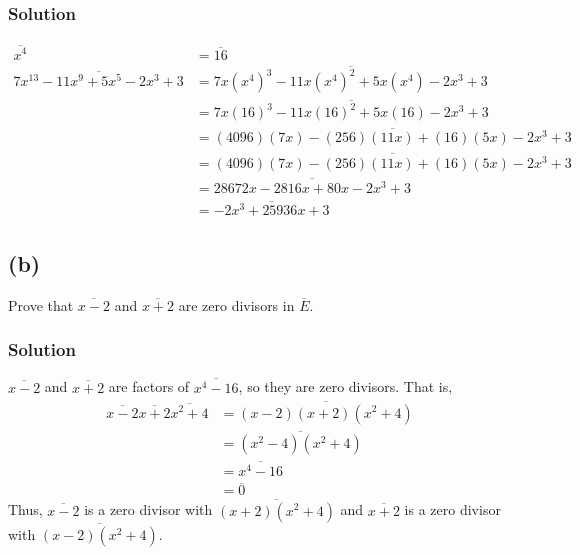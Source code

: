 \documentclass[fleqn]{article}
\begin{document}
            \subsubsection{Solution}
            \begin{align}
                \overline{x^4} &= \overline{16} \\
                \overline{7x^{13} - 11x^9 + 5x^5 - 2x^3 + 3}
                    &= \overline{7x (x^4)^3 - 11x (x^4)^2 + 5x (x^4) - 2x^3 + 3} \\
                    &= \overline{7x (16)^3 - 11x (16)^2 + 5x (16) - 2x^3 + 3} \\
                    &= \overline{(4096)(7x) - (256)(11x) + (16)(5x) - 2x^3 + 3} \\
                    &= \overline{(4096)(7x) - (256)(11x) + (16)(5x) - 2x^3 + 3} \\
                    &= \overline{28672x - 2816x + 80x - 2x^3 + 3} \\
                    &= \overline{-2x^3 + 25936x + 3}
            \end{align}
        
        \subsection{(b)}
        Prove that $\overline{x - 2}$ and $\overline{x + 2}$ are zero divisors in $\overline{E}$.
        
            \subsubsection{Solution}
            $\overline{x - 2}$ and $\overline{x + 2}$ are factors of $\overline{x^4 - 16}$, so they are zero divisors.  That is,
            \begin{align}
                \overline{x - 2} \overline{x + 2} \overline{x^2 + 4}
                    &= \overline{(x - 2)(x + 2)(x^2 + 4)} \\
                    &= \overline{(x^2 - 4)(x^2 + 4)} \\
                    &= \overline{x^4 - 16} \\
                    &= \overline{0}
            \end{align}
            Thus, $\overline{x - 2}$ is a zero divisor with $\overline{(x + 2)(x^2 + 4)}$ and $\overline{x + 2}$ is a zero divisor with $\overline{(x - 2)(x^2 + 4)}$.
    
\end{document}
